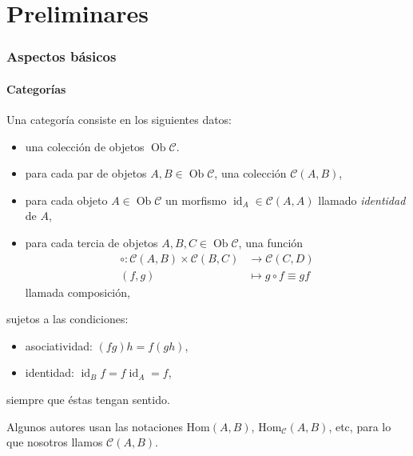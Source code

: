 \documentclass[12pt,letterpaper,titlepage]{article}
\theoremstyle{definition}
\renewcommand\cal[1]{\mathcal{#1}}
\newcommand\<{\langle}
\renewcommand\>{\rangle}
\DeclareMathOperator{\Ob}{Ob}
\DeclareMathOperator{\id}{id}
\begin{document}
\newpage
\listoftheorems[ignoreall,show=exe]

\part{Preliminares}

\section{Aspectos básicos}

\subsection{Categorías}
Una categoría consiste en los siguientes datos:
\begin{itemize}
  \item una colección de objetos $\Ob\cal C$.
  \item para cada par de objetos $A,B\in\Ob\cal C$, una colección
    $\cal C(A,B)$,
  \item para cada objeto $A\in\Ob\cal C$
      un morfismo $\id_A\in\cal C(A,A)$ llamado
      \emph{identidad} de $A$,
  \item para cada tercia de objetos $A,B,C\in\Ob\cal C$, una
    función
    \begin{align*}
        \circ:\cal C(A,B)\times\cal C(B,C)&\to\cal C(C,D) \\
        (f,g)&\mapsto g\circ f\equiv gf
    \end{align*}
    llamada composición,
\end{itemize}
sujetos a las condiciones:
\begin{itemize}
  \item asociatividad: $(fg)h=f(gh)$,
  \item identidad: $\id_B f = f \id_A = f$,
\end{itemize}
siempre que éstas tengan sentido.

Algunos autores usan las notaciones $\text{Hom}(A,B)$,
$\text{Hom}_{\cal C}(A,B)$, etc, para lo que nosotros llamos $\cal
C(A,B)$.
\end{document}
